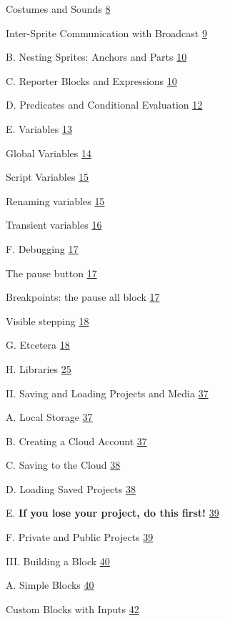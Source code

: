 Costumes and Sounds \hyperref[costumes-and-sounds]{8}

Inter-Sprite Communication with Broadcast
\hyperref[inter-sprite-communication-with-broadcast]{9}

B. Nesting Sprites: Anchors and Parts
\hyperref[nesting-sprites-anchors-and-parts]{10}

C. Reporter Blocks and Expressions
\hyperref[reporter-blocks-and-expressions]{10}

D. Predicates and Conditional Evaluation
\hyperref[predicates-and-conditional-evaluation]{12}

E. Variables \hyperref[variables]{13}

Global Variables \hyperref[global-variables]{14}

Script Variables \hyperref[script-variables]{15}

Renaming variables \hyperref[renaming-variables]{15}

Transient variables \hyperref[transient-variables]{16}

F. Debugging \hyperref[debugging]{17}

The pause button \hyperref[the-pause-button]{17}

Breakpoints: the pause all block
\hyperref[breakpoints-the-pause-all-block]{17}

Visible stepping \hyperref[visible-stepping]{18}

G. Etcetera \hyperref[etcetera]{18}

H. Libraries \hyperref[libraries]{25}

II. Saving and Loading Projects and Media
\hyperref[saving-and-loading-projects-and-media]{37}

A. Local Storage \hyperref[local-storage]{37}

B. Creating a Cloud Account \hyperref[creating-a-cloud-account]{37}

C. Saving to the Cloud \hyperref[saving-to-the-cloud]{38}

D. Loading Saved Projects \hyperref[loading-saved-projects]{38}

E. \textbf{If you lose your project, do this first!}
\hyperref[if-you-lose-your-project-do-this-first]{39}

F. Private and Public Projects
\hyperref[private-and-public-projects]{39}

III. Building a Block \hyperref[building-a-block]{40}

A. Simple Blocks \hyperref[simple-blocks]{40}

Custom Blocks with Inputs \hyperref[custom-blocks-with-inputs]{42}

